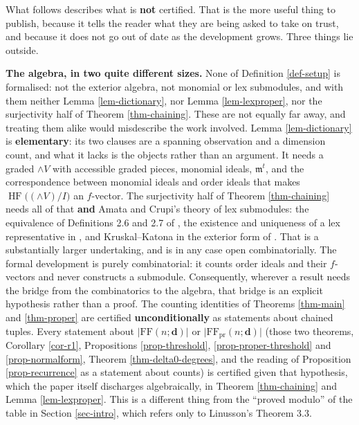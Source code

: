 \documentclass[11pt, a4paper, abstract=yes]{scrartcl}
\theoremstyle{definition}
\theoremstyle{remark}
\theoremstyle{plain}
\newcommand{\vek}[1]{\boldsymbol{#1}}
\newcommand{\HF}{\operatorname{HF}}
\newcommand{\Ext}{\mathord{\wedge }V}
\begin{document}
\begin{itemize}
What follows describes what is \textbf{not} certified. That is the more useful thing to publish, because
it tells the reader what they are being asked to take on trust, and because it does not go out of
date as the development grows. Three things lie outside.

\textbf{The algebra, in two quite different sizes.} None of Definition \ref{def-setup} is formalised: not
the exterior algebra, not monomial or lex submodules, and with them neither Lemma
\ref{lem-dictionary}, nor Lemma \ref{lem-lexproper}, nor the surjectivity half of Theorem
\ref{thm-chaining}. These are not equally far away, and treating them alike would misdescribe the
work involved. Lemma \ref{lem-dictionary} is \textbf{elementary}: its two clauses are a spanning
observation and a dimension count, and what it lacks is the objects rather than an argument. It
needs a graded \(\Ext\) with accessible graded pieces, monomial ideals, \(\mathfrak m^t\), and the
correspondence between monomial ideals and order ideals that makes \(\HF\bigl((\Ext)/I\bigr)\) an
\(f\)-vector. The surjectivity half of Theorem \ref{thm-chaining} needs all of that \textbf{and} Amata
and Crupi's theory of lex submodules: the equivalence of Definitions 2.6 and 2.7 of
\autocite{AmataCrupi2020KK}, the
existence and uniqueness of a lex representative in \autocite[Theorem 4.2]{AmataCrupi2020KK}, and Kruskal--Katona in
the exterior form of \textcite{AramovaHerzogHibi1997}. That is a substantially larger
undertaking, and is in any case open combinatorially. The formal development is
purely combinatorial: it counts order ideals and their \(f\)-vectors and never constructs a
submodule. Consequently, wherever a result needs the bridge from the combinatorics to the algebra,
that bridge is an explicit hypothesis rather than a proof. The counting identities of Theorems
\ref{thm-main} and \ref{thm-proper} are certified \textbf{unconditionally} as statements about chained
tuples. Every statement about \(\lvert\mathrm{FF}(n;\vek d)\rvert\) or
\(\lvert\mathrm{FF}_{\mathrm{pr}}(n;\vek d)\rvert\) (those two theorems, Corollary \ref{cor-r1},
Propositions \ref{prop-threshold}, \ref{prop-proper-threshold} and \ref{prop-normalform}, Theorem
\ref{thm-delta0-degrees}, and the reading of Proposition \ref{prop-recurrence} as a statement about
counts) is certified given that hypothesis, which the paper itself discharges algebraically, in
Theorem \ref{thm-chaining} and Lemma \ref{lem-lexproper}. This is a different thing from the
``proved modulo'' of the table in Section \ref{sec-intro}, which refers only to Linusson's
Theorem 3.3.


\end{itemize}
\end{document}
